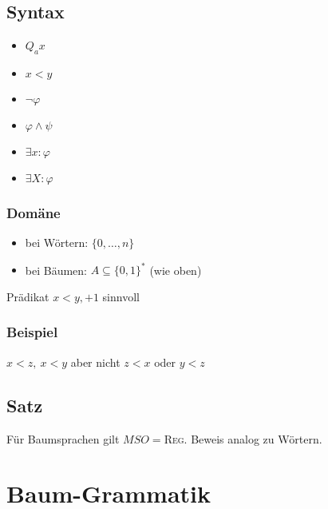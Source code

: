     \subsection{Syntax}
        \begin{itemize}
            \item $Q_ax$
            \item $x<y$
            \item $\neg\varphi$
            \item $\varphi\wedge\psi$
            \item $\exists x:\varphi$
            \item $\exists X:\varphi$
        \end{itemize}
        \subsubsection{Domäne}
            \begin{itemize}
                \item bei Wörtern: $\{0,\dots, n\}$
                \item bei Bäumen: $A\subseteq\{0,1\}^*$ (wie oben)
            \end{itemize}
            Prädikat $x<y, +1$ sinnvoll
        \subsubsection{Beispiel}
            $x<z,\ x<y$ aber nicht $z<x$ oder $y<z$
    \subsection{Satz}
        Für Baumsprachen gilt $MSO=$\textsc{Reg}. Beweis analog zu Wörtern.
\section{Baum-Grammatik}
